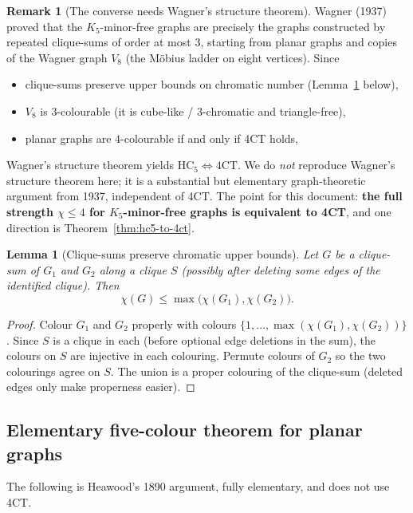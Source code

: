 \documentclass[11pt]{article}
\newtheorem{lemma}[theorem]{Lemma}
\theoremstyle{definition}
\newtheorem{remark}[theorem]{Remark}
\begin{document}
\begin{remark}[The converse needs Wagner's structure theorem]
Wagner (1937) proved that the \(K_5\)-minor-free graphs are precisely the graphs
constructed by repeated clique-sums of order at most \(3\), starting from planar
graphs and copies of the Wagner graph \(V_8\) (the M\"obius ladder on eight
vertices). Since
\begin{itemize}
\item clique-sums preserve upper bounds on chromatic number
(Lemma~\ref{lem:clique-sum-chi} below),
\item \(V_8\) is \(3\)-colourable (it is cube-like / \(3\)-chromatic and triangle-free),
\item planar graphs are \(4\)-colourable if and only if 4CT holds,
\end{itemize}
Wagner's structure theorem yields \(\mathrm{HC}_5\Leftrightarrow\mathrm{4CT}\).
We do \emph{not} reproduce Wagner's structure theorem here; it is a substantial
but elementary graph-theoretic argument from 1937, independent of 4CT. The point
for this document: \textbf{the full strength \(\chi\le 4\) for \(K_5\)-minor-free
graphs is equivalent to 4CT}, and one direction is Theorem~\ref{thm:hc5-to-4ct}.
\end{remark}

\begin{lemma}[Clique-sums preserve chromatic upper bounds]
\label{lem:clique-sum-chi}
Let \(G\) be a clique-sum of \(G_1\) and \(G_2\) along a clique \(S\) (possibly
after deleting some edges of the identified clique). Then
\[
\chi(G)\le\max\bigl(\chi(G_1),\chi(G_2)\bigr).
\]
\end{lemma}

\begin{proof}
Colour \(G_1\) and \(G_2\) properly with colours
\(\{1,\dots,\max(\chi(G_1),\chi(G_2))\}\). Since \(S\) is a clique in each (before
optional edge deletions in the sum), the colours on \(S\) are injective in each
colouring. Permute colours of \(G_2\) so the two colourings agree on \(S\). The
union is a proper colouring of the clique-sum (deleted edges only make properness
easier).
\end{proof}

\subsection{Elementary five-colour theorem for planar graphs}

The following is Heawood's 1890 argument, fully elementary, and does not use
4CT.
\end{document}
